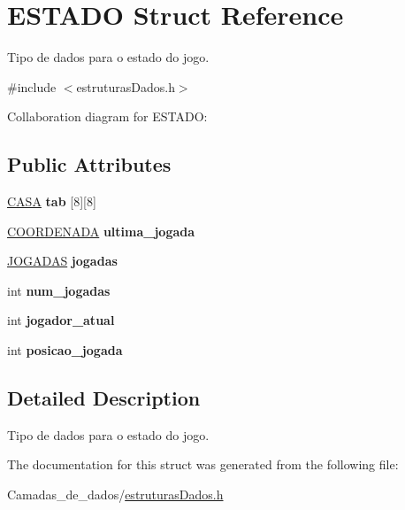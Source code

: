 \hypertarget{structESTADO}{}\section{E\+S\+T\+A\+DO Struct Reference}
\label{structESTADO}


Tipo de dados para o estado do jogo.  




{\ttfamily \#include $<$estruturas\+Dados.\+h$>$}



Collaboration diagram for E\+S\+T\+A\+DO\+:
\subsection*{Public Attributes}
\begin{DoxyCompactItemize}
\item 
\mbox{\label{structESTADO_ab56f0f1be16954d3768b4174d14c087d}} 
\hyperlink{estruturasDados_8h_aba91601f16d4c485b2d9b8c429f27039}{C\+A\+SA} {\bfseries tab} \mbox{[}8\mbox{]}\mbox{[}8\mbox{]}
\item 
\mbox{\label{structESTADO_a4896a5c5c1f40b43fb795623327e3f47}} 
\hyperlink{structCOORDENADA}{C\+O\+O\+R\+D\+E\+N\+A\+DA} {\bfseries ultima\+\_\+jogada}
\item 
\mbox{\label{structESTADO_afae43b87a488fad0f2b56a18bad31d18}} 
\hyperlink{estruturasDados_8h_a94c221d29a1760f008b7834093259b7d}{J\+O\+G\+A\+D\+AS} {\bfseries jogadas}
\item 
\mbox{\label{structESTADO_a261495728744647e618b4e623f5a4b7a}} 
int {\bfseries num\+\_\+jogadas}
\item 
\mbox{\label{structESTADO_a5dd28e2e68b7aef2b6b7ea88e02eff58}} 
int {\bfseries jogador\+\_\+atual}
\item 
\mbox{\label{structESTADO_a3bc6dcc01eba3b86a34e8437d432e90a}} 
int {\bfseries posicao\+\_\+jogada}
\end{DoxyCompactItemize}


\subsection{Detailed Description}
Tipo de dados para o estado do jogo. 

The documentation for this struct was generated from the following file\+:\begin{DoxyCompactItemize}
\item 
Camadas\+\_\+de\+\_\+dados/\hyperlink{estruturasDados_8h}{estruturas\+Dados.\+h}\end{DoxyCompactItemize}
